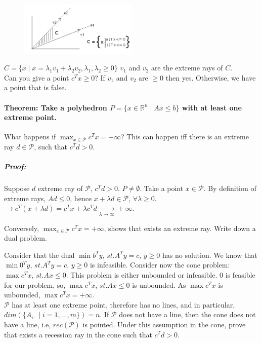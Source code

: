 \documentclass[main]{subfiles}
\begin{document}
\begin{figure}[!h]
  \label{fig:cone}
  \centering
    \includegraphics[width=0.5\textwidth]{imgs/cone.png}
\end{figure}

$C = \{x \mid x =\lambda_1 v_1 + \lambda_2 v_2, \lambda_1, \lambda_2 \geq 0 \}$
$v_1$ and $v_2$ are the extreme rays of $C$.\\
Can you give a point $c^T x \geq 0$? If $v_1$ and $v_2$ are $\geq 0$ then yes.
Otherwise, we have a point that is false.

\paragraph{Theorem: Take a polyhedron $P = \{x \in \mathbb{R}^n \mid Ax \leq b
\}$ with at least one extreme point.} What happens if $\displaystyle \max_{x
\in \mathcal{P}} c^{T} x = +\infty$? This can happen iff there is an extreme
ray $d \in \mathcal{P}$, such that $c^T d > 0$.

\subparagraph{Proof:}
Suppose $d$ extreme ray of $\mathcal{P}$, $c^T d > 0$. $P \neq \emptyset$. Take
a point $x \in \mathcal{P}$. By definition of extreme rays, $Ad \leq 0$, hence
$x + \lambda d \in \mathcal{P}$, $\forall \lambda \geq 0$.\\
$\rightarrow c^T(x +\lambda d) = c^T x + \lambda c^T d \xrightarrow[\lambda \to
\infty]{} +\infty$.

Conversely, $\displaystyle \max_{x \in \mathcal{P}} c^{T} x = +\infty$, shows 
that exists an extreme ray. Write down a dual problem.

Consider that the dual $\min b^T y$, $st. A^T y = c$, $y \geq 0$ has no
solution. We know that $\min 0^T y$, $st. A^T y = c$, $y \geq 0$ is infeasible.
Consider now the cone problem: $\max c^T x$, $st. Ax \leq 0$. This problem is
either unbounded or infeasible. $0$ is feasible for our problem, so,
$\max c^T x$, $st. Ax \leq 0$ is unbounded. As $\max c^T x$ is unbounded,
$\max c^T x = +\infty$.\\

$\mathcal{P}$ has at least one extreme point, therefore has no lines, and in
particular, $dim(\{A_{i\cdot} \mid i = 1, \dots, m\}) = n$. If $\mathcal{P}$
does not have a line, then the cone does not have a line, i.e,
$rec(\mathcal{P})$ is pointed.
Under this assumption in the cone, prove that exists a recession ray in the
cone such that $c^T d > 0$.
\end{document}
